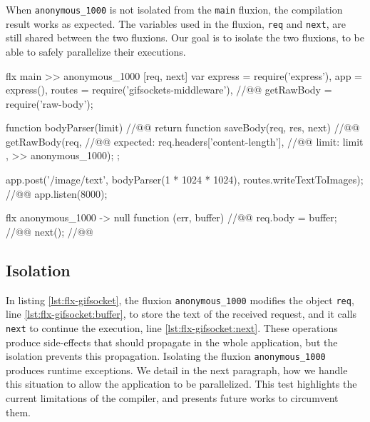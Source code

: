 
When \texttt{anonymous\-\_1000} is not isolated from the \texttt{main} fluxion, the compilation result works as expected.
The variables used in the fluxion, \texttt{req} and \texttt{next}, are still shared between the two fluxions.
Our goal is to isolate the two fluxions, to be able to safely parallelize their executions.

\begin{code}[flx, caption={Compilation result of gifsockets-server},label={lst:flx-gifsocket}]
flx main
>> anonymous_1000 [req, next]
  var express = require('express'),
      app = express(),
      routes = require('gifsockets-middleware'), //@\label{lst:flx-gifsocket:gif-mw}@
      getRawBody = require('raw-body');

  function bodyParser(limit) { //@\label{lst:flx-gifsocket:bodyParser}@
    return function saveBody(req, res, next) { //@\label{lst:flx-gifsocket:saveBody}@
      getRawBody(req, { //@\label{lst:flx-gifsocket:getRawBody}@
        expected: req.headers['content-length'], //@\label{lst:flx-gifsocket:req.headers}@
        limit: limit
      }, >> anonymous_1000);
    };
  }

  app.post('/image/text', bodyParser(1 * 1024 * 1024), routes.writeTextToImages); //@\label{lst:flx-gifsocket:app.post}@
  app.listen(8000);

flx anonymous_1000
-> null
  function (err, buffer) { //@\label{lst:flx-gifsocket:callback}@
    req.body = buffer; //@\label{lst:flx-gifsocket:buffer}@
    next(); //@\label{lst:flx-gifsocket:next}@
  }
\end{code}

\subsection{Isolation}

In listing \ref{lst:flx-gifsocket}, the fluxion \texttt{anonymous\_1000} modifies the object \texttt{req}, line \ref{lst:flx-gifsocket:buffer}, to store the text of the received request, and it calls \texttt{next} to continue the execution, line \ref{lst:flx-gifsocket:next}.
These operations produce side-effects that should propagate in the whole application, but the isolation prevents this propagation.
Isolating the fluxion \texttt{anonymous\_1000} produces runtime exceptions.
We detail in the next paragraph, how we handle this situation to allow the application to be parallelized.
This test highlights the current limitations of the compiler, and presents future works to circumvent them.

